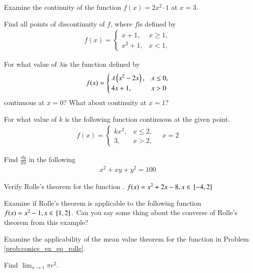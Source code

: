 %
\item Examine the continuity of the function $f(x) = 2x^2– 1$ at $x = 3$.
\item Find all points of discontinuity of $f$, where $f$is defined by
\begin{align}
f(x)=
\begin{cases}
x+1, & x \ge 1,
\\
x^2+1, & x < 1,
\end{cases}
\end{align}
%
\item For what value of $\lambda $is the function defined by 	
%
\begin{align}
f(x)=
\begin{cases}
\lambda\left(x^2-2x\right), & x \le 0,
\\
4x+1, & x > 0
\end{cases}
\end{align}
%
continuous at $x = 0$? What about continuity at $x = 1$?\item For what value of $k$ is the following function 
%
continuous at the given point.
\begin{align}
f(x)=
\begin{cases}
kx^2, & x \le 2,
\\
3, & x > 2,
\end{cases}
\quad x =2
\end{align}
%
\item Find $\frac{dy}{dx}$ in the following
\begin{align}
x^2 +xy + y^2 = 100
\end{align}
%
\item Verify Rolle's theorem for the function 
\label{prob:conics_ex_eq_rolle}.
$
f(x) = x^2+2x-8, x \in {}\left[-4,2\right]
$
\item Examine if Rolle's theorem is applicable to the following function
$
f(x) = x^2-1, x \in {}\left[1,2\right].
$
Can you say some thing about the converse of Rolle's theorem from this example?
\item  Examine the applicability of the mean value theorem for the  function in Problem \ref{prob:conics_ex_eq_rolle}.
%
\item Find $\lim_{x\to 1} \pi r^2$.
